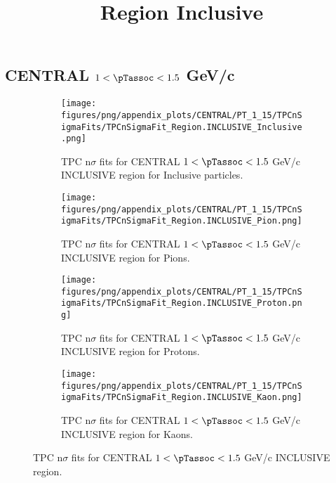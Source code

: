 

    
            \subsection*{CENTRAL $1 < \pTassoc < 1.5$ GeV/c}
            \begin{figure}[H]
                \title{Region Inclusive}
                \begin{subfigure}[b]{0.5\textwidth}
                    \centering
                    \texttt{[image: figures/png/appendix\_plots/CENTRAL/PT\_1\_15/TPCnSigmaFits/TPCnSigmaFit\_Region.INCLUSIVE\_Inclusive.png]}
                    \caption{TPC n$\sigma$ fits for CENTRAL $1 < \pTassoc < 1.5$ GeV/c INCLUSIVE region for Inclusive particles.}
                    \label{fig:appendix_CENTRAL_$1 < \pTassoc < 1.5$ GeV/c_INCLUSIVE_Inclusive}
                \end{subfigure}
                \begin{subfigure}[b]{0.5\textwidth}
                    \centering
                    \texttt{[image: figures/png/appendix\_plots/CENTRAL/PT\_1\_15/TPCnSigmaFits/TPCnSigmaFit\_Region.INCLUSIVE\_Pion.png]}
                    \caption{TPC n$\sigma$ fits for CENTRAL $1 < \pTassoc < 1.5$ GeV/c INCLUSIVE region for Pions.}
                    \label{fig:appendix_CENTRAL_$1 < \pTassoc < 1.5$ GeV/c_INCLUSIVE_Pion}
                \end{subfigure}
                \begin{subfigure}[b]{0.5\textwidth}
                    \centering
                    \texttt{[image: figures/png/appendix\_plots/CENTRAL/PT\_1\_15/TPCnSigmaFits/TPCnSigmaFit\_Region.INCLUSIVE\_Proton.png]}
                    \caption{TPC n$\sigma$ fits for CENTRAL $1 < \pTassoc < 1.5$ GeV/c INCLUSIVE region for Protons.}
                    \label{fig:appendix_CENTRAL_$1 < \pTassoc < 1.5$ GeV/c_INCLUSIVE_Proton}
                \end{subfigure}
                \begin{subfigure}[b]{0.5\textwidth}
                    \centering
                    \texttt{[image: figures/png/appendix\_plots/CENTRAL/PT\_1\_15/TPCnSigmaFits/TPCnSigmaFit\_Region.INCLUSIVE\_Kaon.png]}
                    \caption{TPC n$\sigma$ fits for CENTRAL $1 < \pTassoc < 1.5$ GeV/c INCLUSIVE region for Kaons.}
                    \label{fig:appendix_CENTRAL_$1 < \pTassoc < 1.5$ GeV/c_INCLUSIVE_Kaon}
                \end{subfigure}
                \caption{TPC n$\sigma$ fits for CENTRAL $1 < \pTassoc < 1.5$ GeV/c INCLUSIVE region.}
                \label{fig:appendix_CENTRAL_$1 < \pTassoc < 1.5$ GeV/c_INCLUSIVE}
            \end{figure}
